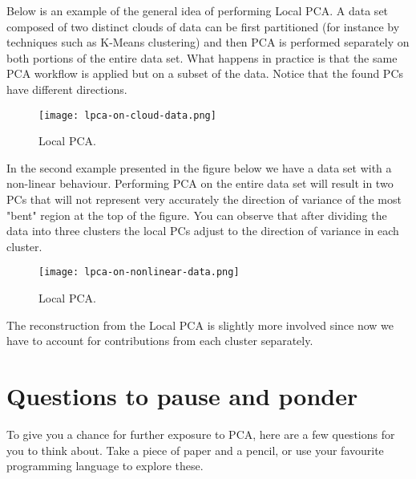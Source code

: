 \documentclass[10pt,twocolumn]{article}
\begin{document}
Below is an example of the general idea of performing Local PCA. A data set composed of two distinct clouds of data can be first partitioned (for instance by techniques such as K-Means clustering) and then PCA is performed separately on both portions of the entire data set. What happens in practice is that the same PCA workflow is applied but on a subset of the data. Notice that the found PCs have different directions.

\begin{figure}[H]
\centering\texttt{[image: lpca-on-cloud-data.png]}
\caption{Local PCA.}
\label{fig:local-pca}
\end{figure}

In the second example presented in the figure below we have a data set with a non-linear behaviour. Performing PCA on the entire data set will result in two PCs that will not represent very accurately the direction of variance of the most "bent" region at the top of the figure. You can observe that after dividing the data into three clusters the local PCs adjust to the direction of variance in each cluster.

\begin{figure}[H]
\centering\texttt{[image: lpca-on-nonlinear-data.png]}
\caption{Local PCA.}
\label{fig:local-pca}
\end{figure}

The reconstruction from the Local PCA is slightly more involved since now we have to account for contributions from each cluster separately.







\section{Questions to pause and ponder} \label{app:questions}

To give you a chance for further exposure to PCA,  here are a few questions for you to think about. Take a piece of paper and a pencil, or use your favourite programming language to explore these.
\end{document}
